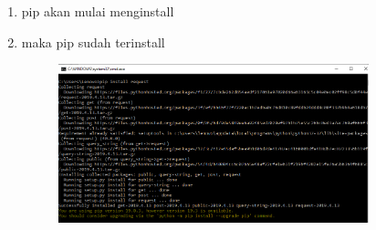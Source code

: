 \begin{enumerate}
    \item pip akan mulai menginstall
	
	\item maka pip sudah terinstall
	\begin{figure} [h]
	\includegraphics[width=9cm]{section/picpyt/pip/pip5.png}
	\centering
	\end{figure}

\end{enumerate}